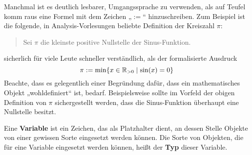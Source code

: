 \begin{nota}
    Manchmal ist es deutlich lesbarer, Umgangssprache zu verwenden, als auf Teufel komm raus eine Formel mit dem Zeichen „$:=$“ hinzuschreiben. Zum Beispiel ist die folgende, in Analysis-Vorlesungen beliebte Definition der Kreiszahl $\pi$:
    \begin{quote}
        Sei $\pi$ die kleinste positive Nullstelle der Sinus-Funktion.
    \end{quote}
    sicherlich für viele Leute schneller verständlich, als der formalisierte Ausdruck
    \[ \pi := \min \{ x\in \mathbb R_{>0} \mid \sin(x)=0\} \]
    Beachte, dass es gelegentlich einer Begründung dafür, dass ein mathematisches Objekt „wohldefiniert“ ist, bedarf. Beispielsweise sollte im Vorfeld der obigen Definition von $\pi$ sichergestellt werden, dass die Sinus-Funktion überhaupt eine Nullstelle besitzt.
\end{nota}


\begin{de}[Variable] \label{def:variable}  
    Eine \textbf{Variable} ist ein Zeichen, das als Platzhalter dient, an dessen Stelle Objekte von einer gewissen Sorte eingesetzt werden können. Die Sorte von Objekten, die für eine Variable eingesetzt werden können, heißt der \textbf{Typ} dieser Variable.
\end{de}


